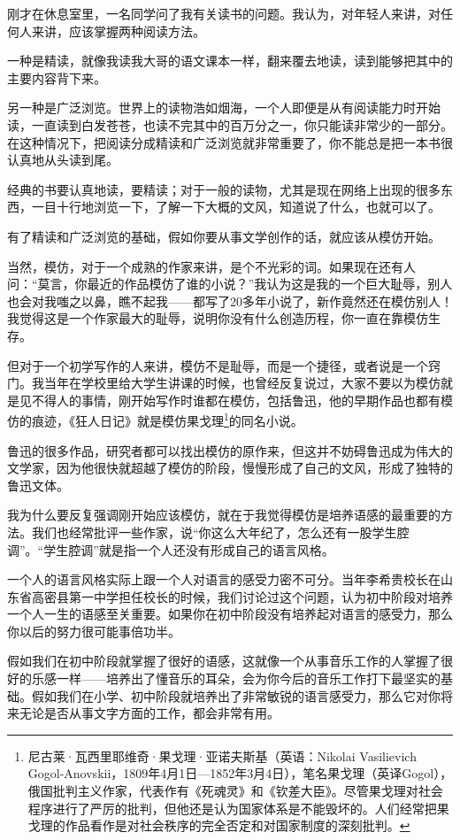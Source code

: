 \documentclass[fontset=fandol,12pt,a5paper]{ctexbook}
\begin{document}
刚才在休息室里，一名同学问了我有关读书的问题。我认为，对年轻人来讲，对任何人来讲，应该掌握两种阅读方法。

一种是精读，就像我读我大哥的语文课本一样，翻来覆去地读，读到能够把其中的主要内容背下来。

另一种是广泛浏览。世界上的读物浩如烟海，一个人即便是从有阅读能力时开始读，一直读到白发苍苍，也读不完其中的百万分之一，你只能读非常少的一部分。在这种情况下，把阅读分成精读和广泛浏览就非常重要了，你不能总是把一本书很认真地从头读到尾。

经典的书要认真地读，要精读；对于一般的读物，尤其是现在网络上出现的很多东西，一目十行地浏览一下，了解一下大概的文风，知道说了什么，也就可以了。

有了精读和广泛浏览的基础，假如你要从事文学创作的话，就应该从模仿开始。

当然，模仿，对于一个成熟的作家来讲，是个不光彩的词。如果现在还有人问：“莫言，你最近的作品模仿了谁的小说？”我认为这是我的一个巨大耻辱，别人也会对我嗤之以鼻，瞧不起我——都写了20多年小说了，新作竟然还在模仿别人！我觉得这是一个作家最大的耻辱，说明你没有什么创造历程，你一直在靠模仿生存。

但对于一个初学写作的人来讲，模仿不是耻辱，而是一个捷径，或者说是一个窍门。我当年在学校里给大学生讲课的时候，也曾经反复说过，大家不要以为模仿就是见不得人的事情，刚开始写作时谁都在模仿，包括鲁迅，他的早期作品也都有模仿的痕迹，《狂人日记》就是模仿果戈理\footnote{尼古莱·瓦西里耶维奇·果戈理·亚诺夫斯基（英语：Nikolai Vasilievich Gogol-Anovskii，1809年4月1日—1852年3月4日），笔名果戈理（英译Gogol），俄国批判主义作家，代表作有《死魂灵》和《钦差大臣》。尽管果戈理对社会程序进行了严厉的批判，但他还是认为国家体系是不能毁坏的。人们经常把果戈理的作品看作是对社会秩序的完全否定和对国家制度的深刻批判。}的同名小说。

鲁迅的很多作品，研究者都可以找出模仿的原作来，但这并不妨碍鲁迅成为伟大的文学家，因为他很快就超越了模仿的阶段，慢慢形成了自己的文风，形成了独特的鲁迅文体。

我为什么要反复强调刚开始应该模仿，就在于我觉得模仿是培养语感的最重要的方法。我们也经常批评一些作家，说“你这么大年纪了，怎么还有一股学生腔调”。“学生腔调”就是指一个人还没有形成自己的语言风格。

一个人的语言风格实际上跟一个人对语言的感受力密不可分。当年李希贵校长在山东省高密县第一中学担任校长的时候，我们讨论过这个问题，认为初中阶段对培养一个人一生的语感至关重要。如果你在初中阶段没有培养起对语言的感受力，那么你以后的努力很可能事倍功半。

假如我们在初中阶段就掌握了很好的语感，这就像一个从事音乐工作的人掌握了很好的乐感一样——培养出了懂音乐的耳朵，会为你今后的音乐工作打下最坚实的基础。假如我们在小学、初中阶段就培养出了非常敏锐的语言感受力，那么它对你将来无论是否从事文字方面的工作，都会非常有用。
\end{document}
